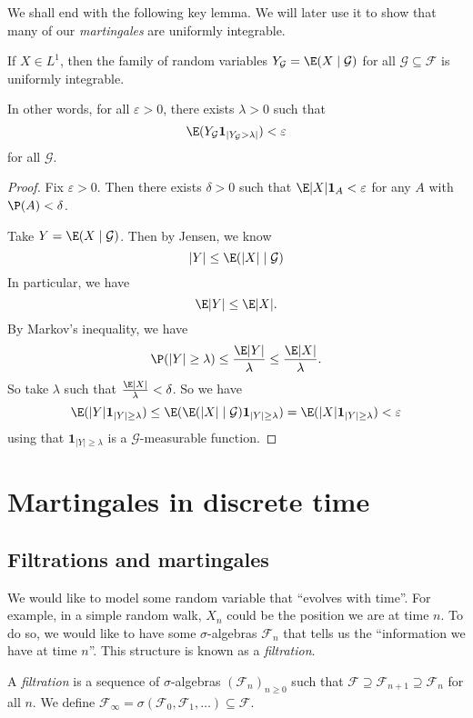 \documentclass[a4paper]{article}
\begin{document}
We shall end with the following key lemma. We will later use it to show that many of our \emph{martingales} are uniformly integrable.
\begin{lemma}
  If $X \in L^1$, then the family of random variables $Y_{\mathcal{G}} = \E(X \mid \mathcal{G})$ for all $\mathcal{G} \subseteq \mathcal{F}$ is uniformly integrable.

  In other words, for all $\varepsilon > 0$, there exists $\lambda > 0$ such that
  \[
    \E(Y_{\mathcal{G}} \mathbf{1}_{|Y_{\mathcal{G}} > \lambda|}) < \varepsilon
  \]
  for all $\mathcal{G}$.
\end{lemma}

\begin{proof}
  Fix $\varepsilon > 0$. Then there exists $\delta > 0$ such that $\E |X|\mathbf{1}_A < \varepsilon$ for any $A$ with $\P(A) < \delta$.

  Take $Y = \E (X \mid \mathcal{G})$. Then by Jensen, we know
  \[
    |Y| \leq \E(|X| \mid \mathcal{G})
  \]
  In particular, we have
  \[
    \E|Y| \leq \E|X|.
  \]
  By Markov's inequality, we have
  \[
    \P(|Y| \geq \lambda) \leq \frac{\E|Y|}{\lambda} \leq \frac{\E|X|}{\lambda}.
  \]
  So take $\lambda$ such that $\frac{\E|X|}{\lambda} < \delta$. So we have
  \[
    \E(|Y| \mathbf{1}_{|Y| \geq \lambda}) \leq \E(\E(|X| \mid \mathcal{G})\mathbf{1}_{|Y| \geq \lambda}) = \E(|X| \mathbf{1}_{|Y| \geq \lambda}) < \varepsilon
  \]
  using that $\mathbf{1}_{|Y| \geq \lambda}$ is a $\mathcal{G}$-measurable function.
\end{proof}

\section{Martingales in discrete time}
\subsection{Filtrations and martingales}
We would like to model some random variable that ``evolves with time''. For example, in a simple random walk, $X_n$ could be the position we are at time $n$. To do so, we would like to have some $\sigma$-algebras $\mathcal{F}_n$ that tells us the ``information we have at time $n$''. This structure is known as a \emph{filtration}.

\begin{defi}[Filtration]
  A \emph{filtration} is a sequence of $\sigma$-algebras $(\mathcal{F}_n)_{n \geq 0}$ such that $\mathcal{F} \supseteq \mathcal{F}_{n + 1} \supseteq \mathcal{F}_n$ for all $n$. We define $\mathcal{F}_\infty = \sigma(\mathcal{F}_0, \mathcal{F}_1, \ldots) \subseteq \mathcal{F}$.
\end{defi}
\end{document}
